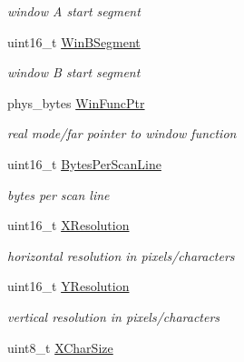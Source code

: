 \begin{DoxyCompactItemize}
\begin{DoxyCompactList}\small\item\em window A start segment \end{DoxyCompactList}\item 
\hypertarget{group__vbe_ga9edf422a931df7c7a1d5f82afb911566}{}uint16\+\_\+t \hyperlink{group__vbe_ga9edf422a931df7c7a1d5f82afb911566}{Win\+B\+Segment}\label{group__vbe_ga9edf422a931df7c7a1d5f82afb911566}

\begin{DoxyCompactList}\small\item\em window B start segment \end{DoxyCompactList}\item 
\hypertarget{group__vbe_gaffd250a4766543099f253e27af3abc35}{}phys\+\_\+bytes \hyperlink{group__vbe_gaffd250a4766543099f253e27af3abc35}{Win\+Func\+Ptr}\label{group__vbe_gaffd250a4766543099f253e27af3abc35}

\begin{DoxyCompactList}\small\item\em real mode/far pointer to window function \end{DoxyCompactList}\item 
\hypertarget{group__vbe_gafe40654a51bf4a12a8b376ff3506688e}{}uint16\+\_\+t \hyperlink{group__vbe_gafe40654a51bf4a12a8b376ff3506688e}{Bytes\+Per\+Scan\+Line}\label{group__vbe_gafe40654a51bf4a12a8b376ff3506688e}

\begin{DoxyCompactList}\small\item\em bytes per scan line \end{DoxyCompactList}\item 
\hypertarget{group__vbe_ga16f6408e5a85c7a7785a0cee64b6a219}{}uint16\+\_\+t \hyperlink{group__vbe_ga16f6408e5a85c7a7785a0cee64b6a219}{X\+Resolution}\label{group__vbe_ga16f6408e5a85c7a7785a0cee64b6a219}

\begin{DoxyCompactList}\small\item\em horizontal resolution in pixels/characters \end{DoxyCompactList}\item 
\hypertarget{group__vbe_gafa8aba2156994750d500f85d0f8425cb}{}uint16\+\_\+t \hyperlink{group__vbe_gafa8aba2156994750d500f85d0f8425cb}{Y\+Resolution}\label{group__vbe_gafa8aba2156994750d500f85d0f8425cb}

\begin{DoxyCompactList}\small\item\em vertical resolution in pixels/characters \end{DoxyCompactList}\item 
\hypertarget{group__vbe_ga047d8f41434f02589d0c9b90b17c67eb}{}uint8\+\_\+t \hyperlink{group__vbe_ga047d8f41434f02589d0c9b90b17c67eb}{X\+Char\+Size}\label{group__vbe_ga047d8f41434f02589d0c9b90b17c67eb}


\end{DoxyCompactItemize}
